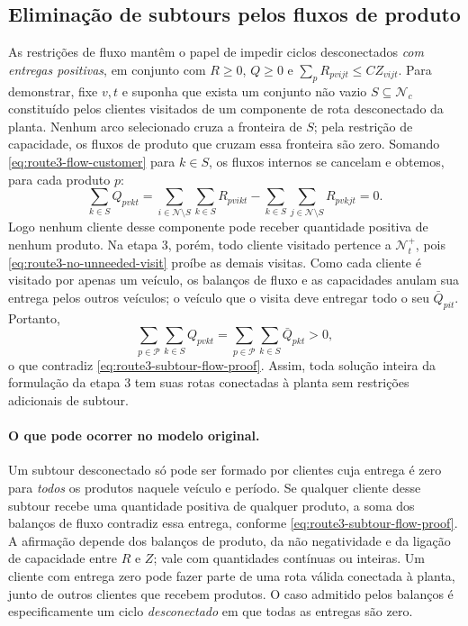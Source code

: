 \documentclass[11pt,a4paper]{article}
\newcommand{\N}{\mathcal{N}}
\newcommand{\Pset}{\mathcal{P}}
\begin{document}
\subsection{Eliminação de subtours pelos fluxos de produto}

As restrições de fluxo mantêm o papel de impedir ciclos desconectados \emph{com entregas positivas}, em conjunto com $R\ge0$, $Q\ge0$ e $\sum_pR_{pvijt}\le CZ_{vijt}$. Para demonstrar, fixe $v,t$ e suponha que exista um conjunto não vazio $S\subseteq\N_c$ constituído pelos clientes visitados de um componente de rota desconectado da planta. Nenhum arco selecionado cruza a fronteira de $S$; pela restrição de capacidade, os fluxos de produto que cruzam essa fronteira são zero. Somando \eqref{eq:route3-flow-customer} para $k\in S$, os fluxos internos se cancelam e obtemos, para cada produto $p$:
\begin{equation}
 \sum_{k\in S}Q_{pvkt}
 =\sum_{i\in\N\setminus S}\sum_{k\in S}R_{pvikt}
 -\sum_{k\in S}\sum_{j\in\N\setminus S}R_{pvkjt}
 =0.
 \label{eq:route3-subtour-flow-proof}
\end{equation}
Logo nenhum cliente desse componente pode receber quantidade positiva de nenhum produto. Na etapa 3, porém, todo cliente visitado pertence a $\N_t^+$, pois \eqref{eq:route3-no-unneeded-visit} proíbe as demais visitas. Como cada cliente é visitado por apenas um veículo, os balanços de fluxo e as capacidades anulam sua entrega pelos outros veículos; o veículo que o visita deve entregar todo o seu $\bar Q_{pit}$. Portanto,
\[
 \sum_{p\in\Pset}\sum_{k\in S}Q_{pvkt}
 =\sum_{p\in\Pset}\sum_{k\in S}\bar Q_{pkt}>0,
\]
o que contradiz \eqref{eq:route3-subtour-flow-proof}. Assim, toda solução inteira da formulação da etapa 3 tem suas rotas conectadas à planta sem restrições adicionais de subtour.

\paragraph{O que pode ocorrer no modelo original.} Um subtour desconectado só pode ser formado por clientes cuja entrega é zero para \emph{todos} os produtos naquele veículo e período. Se qualquer cliente desse subtour recebe uma quantidade positiva de qualquer produto, a soma dos balanços de fluxo contradiz essa entrega, conforme \eqref{eq:route3-subtour-flow-proof}. A afirmação depende dos balanços de produto, da não negatividade e da ligação de capacidade entre $R$ e $Z$; vale com quantidades contínuas ou inteiras. Um cliente com entrega zero pode fazer parte de uma rota válida conectada à planta, junto de outros clientes que recebem produtos. O caso admitido pelos balanços é especificamente um ciclo \emph{desconectado} em que todas as entregas são zero.
\end{document}
